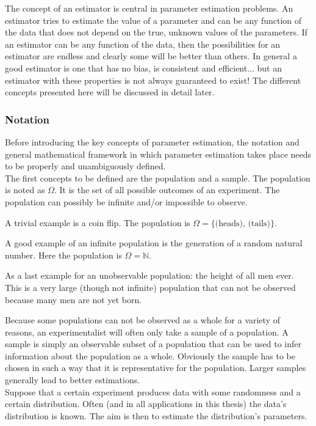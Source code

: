 \documentclass[report,12pt]{report}
\begin{document}
The concept of an estimator is central in parameter estimation problems. An estimator tries to estimate the value of a parameter and can be any function of the data that does not depend on the true, unknown values of the parameters. If an estimator can be any function of the data, then the possibilities for an estimator are endless and clearly some will be better than others. In general a good estimator is one that has no bias, is consistent and efficient... but an estimator with these properties is not always guaranteed to exist! The different concepts presented here will be discussed in detail later.




\subsubsection*{Notation}
Before introducing the key concepts of parameter estimation, the notation and general mathematical framework in which parameter estimation takes place needs to be properly and unambiguously defined.\\

The first concepts to be defined are the population and a sample. The population is noted as $\Omega$. It is the set of all possible outcomes of an experiment. The population can possibly be infinite and/or impossible to observe. 

A trivial example is a coin flip. The population is $\Omega = \{\text{(heads), (tails)}\}$. 

A good example of an infinite population is the generation of a random natural number. Here the population is $\Omega = \mathbb{N}$. 

As a last example for an unobservable population: the height of all men ever. This is a very large (though not infinite) population that can not be observed because many men are not yet born.

Because some populations can not be observed as a whole for a variety of reasons, an experimentalist will often only take a sample of a population. A sample is simply an observable subset of a population that can be used to infer information about the population as a whole. Obviously the sample has to be chosen in such a way that it is representative for the population. Larger samples generally lead to better estimations.\\

Suppose that a certain experiment produces data with some randomness and a certain distribution. Often (and in all applications in this thesis) the data's distribution is known. The aim is then to estimate the distribution's parameters.\\
\end{document}
